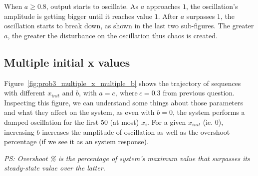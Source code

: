 When $a \ge 0.8$, output starts to oscillate. As $a$ approaches $1$, the oscillation's amplitude is getting bigger until it reaches value $1$.
After $a$ surpasses $1$, the oscillation starts to break down, as shown in the last two sub-figures. The greater $a$, the greater the disturbance on the oscillation thus chaos is created.

\subsection{Multiple initial x values}

Figure~\ref{fig:prob3_multiple_x_multiple_b} shows the trajectory of sequences with different $x_{init}$ and $b$, with $a = c, \ \text{where} \ c = 0.3$ from previous question.
Inspecting this figure, we can understand some things about those parameters and what they affect on the system, as even with $b=0$, the system performs a damped oscillation for the first 50 (at most) $x_i$.
For a given $x_{init}$ (ie. $0$), increasing $b$ increases the amplitude of oscillation as well as the overshoot percentage (if we see it as an system response).

\textit{PS: Overshoot \% is the percentage of system's maximum value that surpasses its steady-state value over the latter.}


